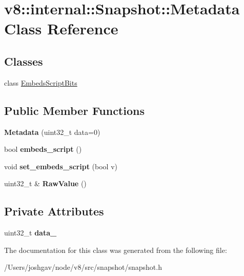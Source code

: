 \hypertarget{classv8_1_1internal_1_1_snapshot_1_1_metadata}{}\section{v8\+:\+:internal\+:\+:Snapshot\+:\+:Metadata Class Reference}
\label{classv8_1_1internal_1_1_snapshot_1_1_metadata}
\subsection*{Classes}
\begin{DoxyCompactItemize}
\item 
class \hyperlink{classv8_1_1internal_1_1_snapshot_1_1_metadata_1_1_embeds_script_bits}{Embeds\+Script\+Bits}
\end{DoxyCompactItemize}
\subsection*{Public Member Functions}
\begin{DoxyCompactItemize}
\item 
{\bfseries Metadata} (uint32\+\_\+t data=0)\hypertarget{classv8_1_1internal_1_1_snapshot_1_1_metadata_a0d0c03fe0d57730d8604c6dc477d8746}{}\label{classv8_1_1internal_1_1_snapshot_1_1_metadata_a0d0c03fe0d57730d8604c6dc477d8746}

\item 
bool {\bfseries embeds\+\_\+script} ()\hypertarget{classv8_1_1internal_1_1_snapshot_1_1_metadata_a508fb5495c4696b8aa65c5a37d031154}{}\label{classv8_1_1internal_1_1_snapshot_1_1_metadata_a508fb5495c4696b8aa65c5a37d031154}

\item 
void {\bfseries set\+\_\+embeds\+\_\+script} (bool v)\hypertarget{classv8_1_1internal_1_1_snapshot_1_1_metadata_a0ea16c116a62330aa514110eb9e32c8d}{}\label{classv8_1_1internal_1_1_snapshot_1_1_metadata_a0ea16c116a62330aa514110eb9e32c8d}

\item 
uint32\+\_\+t \& {\bfseries Raw\+Value} ()\hypertarget{classv8_1_1internal_1_1_snapshot_1_1_metadata_a3f624d2b055e8c15b8103d4f30098d19}{}\label{classv8_1_1internal_1_1_snapshot_1_1_metadata_a3f624d2b055e8c15b8103d4f30098d19}

\end{DoxyCompactItemize}
\subsection*{Private Attributes}
\begin{DoxyCompactItemize}
\item 
uint32\+\_\+t {\bfseries data\+\_\+}\hypertarget{classv8_1_1internal_1_1_snapshot_1_1_metadata_ac9735adf8a83db5bae6578e035ef2cc0}{}\label{classv8_1_1internal_1_1_snapshot_1_1_metadata_ac9735adf8a83db5bae6578e035ef2cc0}

\end{DoxyCompactItemize}


The documentation for this class was generated from the following file\+:\begin{DoxyCompactItemize}
\item 
/\+Users/joshgav/node/v8/src/snapshot/snapshot.\+h\end{DoxyCompactItemize}

